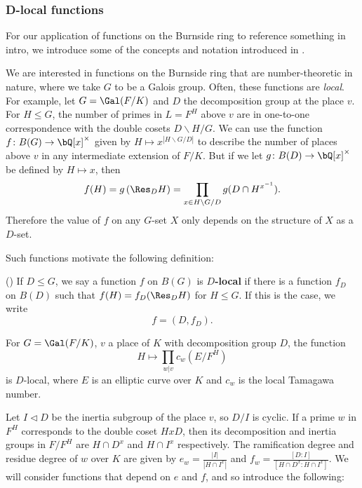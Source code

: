 \subsubsection{D-local functions}\label{D-loc}

For our application of functions on the Burnside ring to {\color{red} reference something in intro}, we introduce some of the concepts and notation introduced in \cite[Section 2.iii]{reg-const}.

We are interested in functions on the Burnside ring that are number-theoretic in nature, where we take $G$ to be a Galois group. Often, these functions are \textit{local}. For example, let $G = \Gal(F / K)$ and $D$ the decomposition group at the place $v$. For $H \leq G$, the number of primes in $L = F^{H}$ above $v$ are in one-to-one correspondence with the double cosets $D \backslash H / G$. We can use the function $f \colon B(G) \to \bQ[x]^{\times}$ given by $H \mapsto  x^{| H \backslash G / D|}$ to describe the number of places above $v$ in any intermediate extension of $F / K$. But if we let $g \colon B(D) \to \bQ[x]^{\times}$ be defined by $H \mapsto x$, then 
        \[ f(H) = g\left(\Res_D H\right) = \prod_{x \in H \backslash G / D} g(D \cap H^{x^{-1}}) .\]
Therefore the value of $f$ on any $G$-set $X$ only depends on the structure of $X$ as a $D$-set. 

Such functions motivate the following definition:

\begin{defn}(\cite[Definition 2.33]{reg-const})\label{D-loc-fn}
    If $D \leq G$, we say a function $f$ on $B(G)$ is \textbf{$D$-local} if there is a function $f_D$ on $B(D)$ such that $f(H) = f_D(\Res_D H)$ for $H \leq G$.
    If this is the case, we write
    \[ f = (D, f_D). \]
\end{defn}

\begin{example}\label{tama-ex}
    For $G = \Gal(F / K)$, $v$ a place of $K$ with decomposition group $D$, the function
    \[ H \mapsto \prod_{w | v} c_w(E / F^{H}) \]
    is $D$-local, where $E$ is an elliptic curve over $K$ and $c_w$ is the local Tamagawa number. 
\end{example}

Let $I \triangleleft D$ be the inertia subgroup of the place $v$, so $D / I$ is cyclic. If a prime $w$ in $F^H$ corresponds to the double coset $HxD$, then its decomposition and inertia groups in $F / F^H$ are $H \cap D^x$ and $H \cap I^x$ respectively.
The ramification degree and residue degree of $w$ over $K$ are given by $e_w = \frac{|I|}{|H \cap I^x|}$ and $f_w = \frac{[D \colon I]}{[H \cap D^x \colon H \cap I^x]}$. We will consider functions that depend on $e$ and $f$, and so introduce the following:

